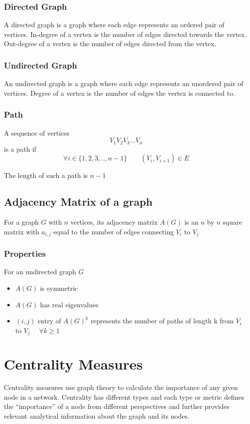 \documentclass[12pt, a4paper]{article}
\begin{document}
        \subsubsection{Directed Graph}
        A directed graph is a graph where each edge represents an ordered pair of vertices. In-degree of a vertex is the number of edges directed towards the vertex. Out-degree of a vertex is the number of edges directed from the vertex.
        \subsubsection{Undirected Graph}
        An undirected graph is a graph where each edge represents an unordered pair of vertices. Degree of a vertex is the number of edges the vertex is connected to.

        \subsubsection{Path}
        \begin{flushleft}
        A sequence of vertices $$V_1V_2V_3...V_n$$ is a path if 
        $$\forall i \in \{1,2,3,..,n-1\} \qquad (V_{i}, V_{i+1}) \in E$$

        The length of such a path is $n-1$
        \end{flushleft}

      \subsection{Adjacency Matrix of a graph}
      For a graph $G$ with $n$ vertices, its adjacency matrix $A(G)$ is an $n$ by $n$ square matrix with $a_{i,j}$ equal to the number of edges connecting $V_i$ to $V_j$

        \subsubsection{Properties}
        For an undirected graph $G$
        \begin{itemize}
          \item $A(G)$ is symmetric 
          \item $A(G)$ has real eigenvalues
          \item $(i,j)$ entry of $A(G)^k$ represents the number of paths of length k from $V_i$ to $V_j$ $\quad \forall k \ge 1$
        \end{itemize}

    \section{Centrality Measures}
    Centrality measures use graph theory to calculate the importance of any given node in a network. Centrality has different types and each type or metric defines the “importance” of a node from different perspectives and further provides relevant analytical information about the graph and its nodes.\cite{Disney22}
\end{document}
